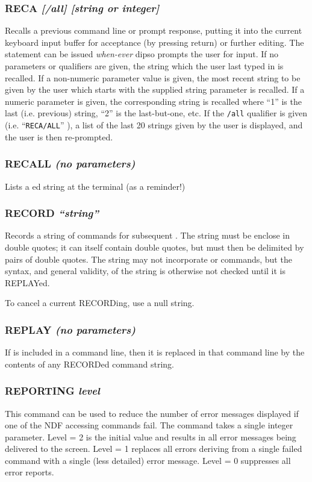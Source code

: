 \documentclass[twoside,11pt,noabs,nolof]{starlink}
\providecommand{\dipcom}[3]{\subsubsection*{\label{COM:#1}\textbf{#1} \emph{#2}}}
\begin{document}
\dipcom{RECA}{[/all] [string or integer]}{Recalls a previous command or prompt response}
Recalls a previous command line or prompt response, putting it into the
current keyboard input buffer for acceptance (by pressing return) or
further editing. The   statement can be issued \emph{when-ever} dipso
prompts the user for input. If no parameters or qualifiers are given, the
string which the user last typed in is recalled. If a non-numeric
parameter value is given, the most recent string to be given by the user
which starts with the supplied string parameter is recalled. If a numeric
parameter is given, the corresponding string is recalled where ``1'' is
the last (i.e. previous) string, ``2'' is the last-but-one, etc. If the
{\texttt{/all}}  qualifier is given (i.e. ``{\texttt{RECA/ALL}}''  ), a list of the
last 20 strings given by the user is displayed, and the user is then
re-prompted.

\dipcom{RECALL}{(no parameters)}{Displays a previously RECORDed string (does not execute it)}
Lists a ed string at the terminal (as a
reminder!)

\dipcom{RECORD}{``string''}{Records a string of commands for subsequent {\texttt{REPLAY}}}
Records a string of commands for subsequent .  The string must be
enclose in double quotes; it can itself contain double quotes, but
must then be delimited by pairs of double quotes. The string may not
incorporate   or   commands, but the syntax, and general
validity, of the string is otherwise not checked until it is REPLAYed.

To cancel a current RECORDing, use a null string.

\dipcom{REPLAY}{(no parameters)}{Substitutes a previously RECORDed string into the command buffer }
If   is included in a command line, then it is replaced in that
command line by the contents of any RECORDed command string.

\dipcom{REPORTING}{level}{Controls the number of error messages displayed }
This command can be used to reduce the number of error messages displayed if one
of the NDF accessing commands fail. The command takes a single integer
parameter. Level = 2 is the initial value and results in all error messages
being delivered to the screen. Level = 1 replaces all errors deriving from a
single failed command with a single (less detailed) error message. Level = 0
suppresses all error reports.
\end{document}
